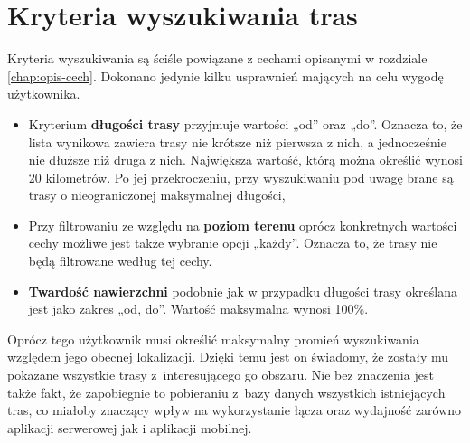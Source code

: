 \section{Kryteria wyszukiwania tras}\label{chap:kryteria}
Kryteria wyszukiwania są ściśle powiązane z cechami opisanymi w rozdziale \ref{chap:opis-cech}. Dokonano jedynie kilku usprawnień mających na celu wygodę użytkownika.
\begin{itemize}
\item{Kryterium \textbf{długości trasy} przyjmuje wartości „od” oraz „do”. Oznacza to, że lista wynikowa zawiera trasy nie krótsze niż pierwsza z nich, a jednocześnie nie dłuższe niż druga z nich. Największa wartość, którą można określić wynosi 20 kilometrów.  Po jej przekroczeniu, przy wyszukiwaniu pod uwagę brane są trasy o nieograniczonej maksymalnej długości,}
\item{Przy filtrowaniu ze względu na \textbf{poziom terenu} oprócz konkretnych wartości cechy możliwe jest także wybranie opcji „każdy”. Oznacza to, że trasy nie będą filtrowane według tej cechy.}
\item{\textbf{Twardość nawierzchni} podobnie jak w przypadku długości trasy określana jest jako zakres  „od, do”. Wartość maksymalna wynosi 100\%.}
\end{itemize}
Oprócz tego użytkownik musi określić maksymalny promień wyszukiwania względem jego obecnej lokalizacji. Dzięki temu jest on świadomy, że zostały mu pokazane wszystkie trasy z~interesującego go obszaru. Nie bez znaczenia jest także fakt, że zapobiegnie to pobieraniu z~bazy danych wszystkich istniejących tras, co miałoby znaczący wpływ na wykorzystanie łącza oraz wydajność zarówno aplikacji serwerowej jak i aplikacji mobilnej.
